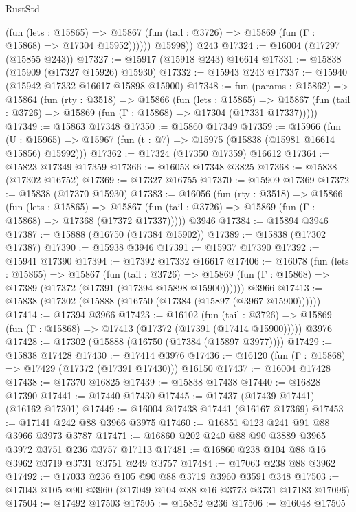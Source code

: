 \begin{lexlean}{RustStd}
\begin{coremodule}
              (fun (lets : @15865) =>
              @15867 (fun (tail : @3726) => @15869 (fun (Γ : @15868) => @17304 @15952))))))
        @15998))
    @243
@17324 := @16004 (@17297 (@15855 @243))
@17327 := @15917 (@15918 @243) @16614
@17331 := @15838 (@15909 (@17327 @15926) @15930)
@17332 := @15943 @243
@17337 := @15940 (@15942 @17332 @16617 @15898 @15900)
@17348 := fun (params : @15862) =>
  @15864
    (fun (rty : @3518) =>
    @15866
      (fun (lets : @15865) =>
      @15867 (fun (tail : @3726) => @15869 (fun (Γ : @15868) => @17304 (@17331 @17337)))))
@17349 := @15863 @17348
@17350 := @15860 @17349
@17359 := @15966
    (fun (U : @15965) => @15967 (fun (t : @7) => @15975 (@15838 (@15981 @16614 @15856) @15992)))
@17362 := @17324 (@17350 @17359) @16612
@17364 := @15823 @17349 @17359
@17366 := @16053 @17348 @3825
@17368 := @15838 (@17302 @16752)
@17369 := @17327 @16755
@17370 := @15909 @17369
@17372 := @15838 (@17370 @15930)
@17383 := @16056
    (fun (rty : @3518) =>
    @15866
      (fun (lets : @15865) =>
      @15867 (fun (tail : @3726) => @15869 (fun (Γ : @15868) => @17368 (@17372 @17337)))))
    @3946
@17384 := @15894 @3946
@17387 := @15888 (@16750 (@17384 @15902))
@17389 := @15838 (@17302 @17387)
@17390 := @15938 @3946
@17391 := @15937 @17390
@17392 := @15941 @17390
@17394 := @17392 @17332 @16617
@17406 := @16078
    (fun (lets : @15865) =>
    @15867
      (fun (tail : @3726) =>
      @15869 (fun (Γ : @15868) => @17389 (@17372 (@17391 (@17394 @15898 @15900))))))
    @3966
@17413 := @15838 (@17302 (@15888 (@16750 (@17384 (@15897 (@3967 @15900))))))
@17414 := @17394 @3966
@17423 := @16102
    (fun (tail : @3726) => @15869 (fun (Γ : @15868) => @17413 (@17372 (@17391 (@17414 @15900)))))
    @3976
@17428 := @17302 (@15888 (@16750 (@17384 (@15897 @3977))))
@17429 := @15838 @17428
@17430 := @17414 @3976
@17436 := @16120 (fun (Γ : @15868) => @17429 (@17372 (@17391 @17430))) @16150
@17437 := @16004 @17428
@17438 := @17370 @16825
@17439 := @15838 @17438
@17440 := @16828 @17390
@17441 := @17440 @17430
@17445 := @17437 (@17439 @17441) (@16162 @17301)
@17449 := @16004 @17438 @17441 (@16167 @17369)
@17453 := @17141 @242 @88 @3966 @3975
@17460 := @16851 @123 @241 @91 @88 @3966 @3973 @3787
@17471 := @16860 @202 @240 @88 @90 @3889 @3965 @3972 @3751 @236 @3757 @17113
@17481 := @16860 @238 @104 @88 @16 @3962 @3719 @3731 @3751 @249 @3757
@17484 := @17063 @238 @88 @3962
@17492 := @17033 @236 @105 @90 @88 @3719 @3960 @3591 @348
@17503 := @17043 @105 @90 @3960 (@17049 @104 @88 @16 @3773 @3731 @17183 @17096)
@17504 := @17492 @17503
@17505 := @15852 @236
@17506 := @16048 @17505

\end{coremodule}
\end{lexlean}
